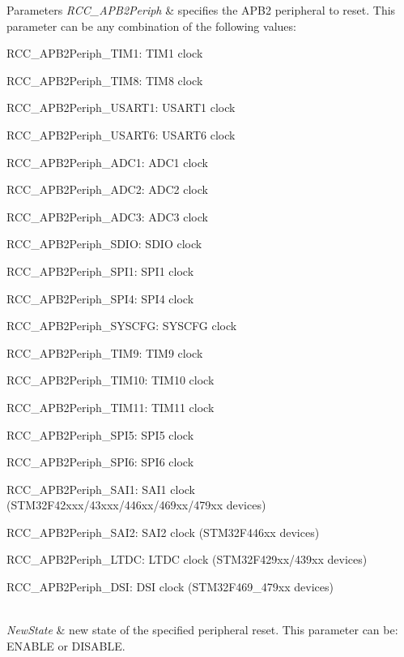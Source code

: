 \begin{DoxyParams}{Parameters}
{\em R\+C\+C\+\_\+\+A\+P\+B2\+Periph} & specifies the A\+P\+B2 peripheral to reset. This parameter can be any combination of the following values\+: \begin{DoxyItemize}
\item R\+C\+C\+\_\+\+A\+P\+B2\+Periph\+\_\+\+T\+I\+M1\+: T\+I\+M1 clock \item R\+C\+C\+\_\+\+A\+P\+B2\+Periph\+\_\+\+T\+I\+M8\+: T\+I\+M8 clock \item R\+C\+C\+\_\+\+A\+P\+B2\+Periph\+\_\+\+U\+S\+A\+R\+T1\+: U\+S\+A\+R\+T1 clock \item R\+C\+C\+\_\+\+A\+P\+B2\+Periph\+\_\+\+U\+S\+A\+R\+T6\+: U\+S\+A\+R\+T6 clock \item R\+C\+C\+\_\+\+A\+P\+B2\+Periph\+\_\+\+A\+D\+C1\+: A\+D\+C1 clock \item R\+C\+C\+\_\+\+A\+P\+B2\+Periph\+\_\+\+A\+D\+C2\+: A\+D\+C2 clock \item R\+C\+C\+\_\+\+A\+P\+B2\+Periph\+\_\+\+A\+D\+C3\+: A\+D\+C3 clock \item R\+C\+C\+\_\+\+A\+P\+B2\+Periph\+\_\+\+S\+D\+IO\+: S\+D\+IO clock \item R\+C\+C\+\_\+\+A\+P\+B2\+Periph\+\_\+\+S\+P\+I1\+: S\+P\+I1 clock \item R\+C\+C\+\_\+\+A\+P\+B2\+Periph\+\_\+\+S\+P\+I4\+: S\+P\+I4 clock ~\newline
 \item R\+C\+C\+\_\+\+A\+P\+B2\+Periph\+\_\+\+S\+Y\+S\+C\+FG\+: S\+Y\+S\+C\+FG clock \item R\+C\+C\+\_\+\+A\+P\+B2\+Periph\+\_\+\+T\+I\+M9\+: T\+I\+M9 clock \item R\+C\+C\+\_\+\+A\+P\+B2\+Periph\+\_\+\+T\+I\+M10\+: T\+I\+M10 clock \item R\+C\+C\+\_\+\+A\+P\+B2\+Periph\+\_\+\+T\+I\+M11\+: T\+I\+M11 clock \item R\+C\+C\+\_\+\+A\+P\+B2\+Periph\+\_\+\+S\+P\+I5\+: S\+P\+I5 clock \item R\+C\+C\+\_\+\+A\+P\+B2\+Periph\+\_\+\+S\+P\+I6\+: S\+P\+I6 clock \item R\+C\+C\+\_\+\+A\+P\+B2\+Periph\+\_\+\+S\+A\+I1\+: S\+A\+I1 clock (S\+T\+M32\+F42xxx/43xxx/446xx/469xx/479xx devices) \item R\+C\+C\+\_\+\+A\+P\+B2\+Periph\+\_\+\+S\+A\+I2\+: S\+A\+I2 clock (S\+T\+M32\+F446xx devices) \item R\+C\+C\+\_\+\+A\+P\+B2\+Periph\+\_\+\+L\+T\+DC\+: L\+T\+DC clock (S\+T\+M32\+F429xx/439xx devices) \item R\+C\+C\+\_\+\+A\+P\+B2\+Periph\+\_\+\+D\+SI\+: D\+SI clock (S\+T\+M32\+F469\+\_\+479xx devices) \end{DoxyItemize}
\\
\hline
{\em New\+State} & new state of the specified peripheral reset. This parameter can be\+: E\+N\+A\+B\+LE or D\+I\+S\+A\+B\+LE. \\
\hline
\end{DoxyParams}

